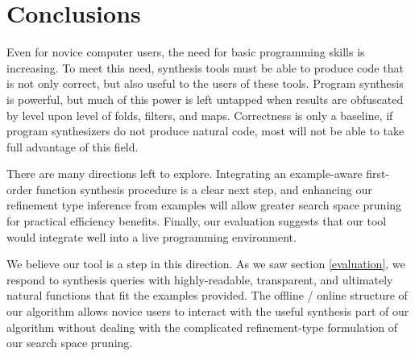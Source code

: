 \section{Conclusions}
\label{conclusions}
Even for novice computer users, the need for basic programming skills is increasing. To meet this need, synthesis tools must be able to produce code that is not only correct, but also useful to the users of these tools. Program synthesis is powerful, but much of this power is left untapped when results are obfuscated by level upon level of folds, filters, and maps. Correctness is only a baseline, if program synthesizers do not produce natural code, most will not be able to take full advantage of this field.

There are many directions left to explore. Integrating an example-aware first-order function synthesis procedure is a clear next step, and enhancing our refinement type inference from examples will allow greater search space pruning for practical efficiency benefits. Finally, our evaluation suggests that our tool would integrate well into a live programming environment.

We believe our tool is a step in this direction. As we saw section \ref{evaluation}, we respond to synthesis queries with highly-readable, transparent, and ultimately natural functions that fit the examples provided. The offline / online structure of our algorithm allows novice users to interact with the useful synthesis part of our algorithm without dealing with the complicated refinement-type formulation of our search space pruning.

